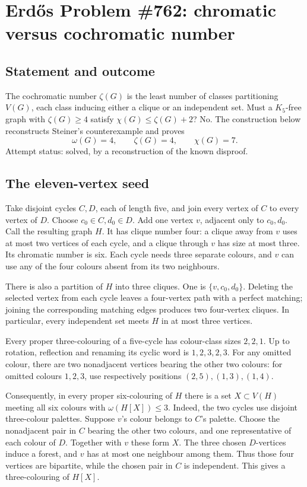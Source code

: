 \section*{Erd\H{o}s Problem \#762: chromatic versus cochromatic number}
\subsection*{Statement and outcome}
The cochromatic number \(\zeta(G)\) is the least number of classes partitioning \(V(G)\), each class inducing either a clique or an independent set. Must a \(K_5\)-free graph with \(\zeta(G)\geq4\) satisfy \(\chi(G)\leq\zeta(G)+2\)?
No. The construction below reconstructs Steiner's counterexample and proves
\[
\omega(G)=4,\qquad \zeta(G)=4,\qquad \chi(G)=7.
\]
Attempt status: solved, by a reconstruction of the known disproof.

\subsection*{The eleven-vertex seed}
Take disjoint cycles \(C,D\), each of length five, and join every vertex of \(C\) to every vertex of \(D\). Choose \(c_0\in C,d_0\in D\). Add one vertex \(v\), adjacent only to \(c_0,d_0\). Call the resulting graph \(H\).
It has clique number four: a clique away from \(v\) uses at most two vertices of each cycle, and a clique through \(v\) has size at most three. Its chromatic number is six. Each cycle needs three separate colours, and \(v\) can use any of the four colours absent from its two neighbours.

There is also a partition of \(H\) into three cliques. One is \(\{v,c_0,d_0\}\). Deleting the selected vertex from each cycle leaves a four-vertex path with a perfect matching; joining the corresponding matching edges produces two four-vertex cliques. In particular, every independent set meets \(H\) in at most three vertices.

Every proper three-colouring of a five-cycle has colour-class sizes \(2,2,1\). Up to rotation, reflection and renaming its cyclic word is \(1,2,3,2,3\). For any omitted colour, there are two nonadjacent vertices bearing the other two colours: for omitted colours \(1,2,3\), use respectively positions \((2,5),(1,3),(1,4)\).

Consequently, in every proper six-colouring of \(H\) there is a set \(X\subset V(H)\) meeting all six colours with \(\omega(H[X])\leq3\). Indeed, the two cycles use disjoint three-colour palettes. Suppose \(v\)'s colour belongs to \(C\)'s palette. Choose the nonadjacent pair in \(C\) bearing the other two colours, and one representative of each colour of \(D\). Together with \(v\) these form \(X\). The three chosen \(D\)-vertices induce a forest, and \(v\) has at most one neighbour among them. Thus those four vertices are bipartite, while the chosen pair in \(C\) is independent. This gives a three-colouring of \(H[X]\).

